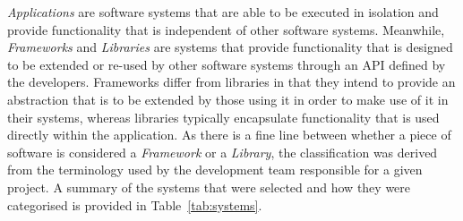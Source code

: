 \emph{Applications} are software systems that are able to be executed in isolation and provide functionality that is independent of other software systems. Meanwhile, \emph{Frameworks} and \emph{Libraries} are systems that provide functionality that is designed to be extended or re-used by other software systems through an API defined by the developers. Frameworks differ from libraries in that they intend to provide an abstraction that is to be extended by those using it in order to make use of it in their systems, whereas libraries typically encapsulate functionality that is used directly within the application. As there is a fine line between whether a piece of software is considered a \emph{Framework} or a \emph{Library}, the classification was derived from the terminology used by the development team responsible for a given project. A summary of the systems that were selected and how they were categorised is provided in Table~\ref{tab:systems}.

